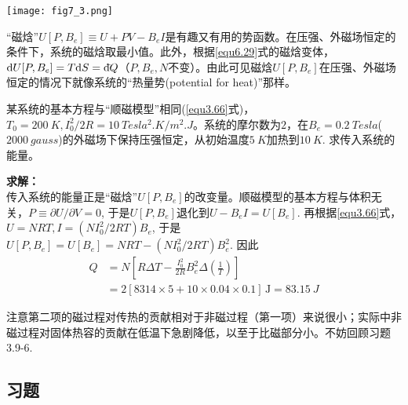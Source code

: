 {
	\centering
	\texttt{[image: fig7\_3.png]}
	\figcaption{}
	\label{fig7.3}
}

“磁焓”$U[P, B_e] \equiv U + PV - B_e I$是有趣又有用的势函数。在压强、外磁场恒定的条件下，系统的磁焓取最小值。此外，根据\eqref{equ6.29}式的磁焓变体，$\mathrm{d} U[P, B_e] = T\mathrm{d} S = \mathrm d\hspace*{-0.1em}\bar{}\hspace*{0.08em} Q$（$P, B_e, N$不变）。由此可见磁焓$U[P, B_e]$在压强、外磁场恒定的情况下就像系统的“热量势(potential for heat)”那样。

\begin{example}
某系统的基本方程与“顺磁模型”相同(\eqref{equ3.66}式)，$T_0 = \SI{200}{K}, I_0^2 / 2R = \SI{10}{Tesla^2.K\per m^2.J}$。系统的摩尔数为$2$，在$B_e = \SI{0.2}{Tesla}$($\SI{2000}{gauss}$)的外磁场下保持压强恒定，从初始温度$\SI{5}{K}$加热到$\SI{10}{K}$. 求传入系统的能量。

{\bf 求解：}\\
传入系统的能量正是“磁焓”$U[P, B_e]$的改变量。顺磁模型的基本方程与体积无关，$P \equiv \partial U / \partial V = 0$, 于是$U[P, B_e]$退化到$U - B_e I = U[B_e]$. 再根据\eqref{equ3.66}式，$U = NRT, I = (NI_0^2 / 2RT) B_e$, 于是$U[P, B_e] = U[B_e] = NRT - (NI_0^2 / 2RT) B_e^2$. 因此 
\begin{align*}
	Q &= N \left[ R\Delta T - \frac{I_0^2}{2R} B_e^2 \Delta \left( \frac{1}{T} \right) \right] \\
	&= 2 [8314 \times 5 + 10 \times 0.04 \times 0.1] \,\mathrm{J} = \SI{83.15}{J}
\end{align*}

注意第二项的磁过程对传热的贡献相对于非磁过程（第一项）来说很小；实际中非磁过程对固体热容的贡献在低温下急剧降低，以至于比磁部分小。不妨回顾习题3.9-6.

\end{example}


\subsection*{习题}
